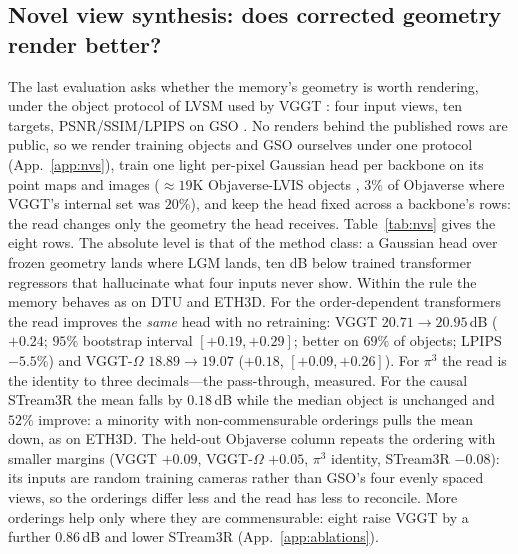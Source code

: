 \documentclass{article}
\begin{document}
\subsection{Novel view synthesis: does corrected geometry render better?}
\label{sec:nvs}
The last evaluation asks whether the memory's geometry is worth rendering,
under the object protocol of LVSM \citep{lvsm} used by VGGT \citep{vggt}:
four input views, ten targets, PSNR/SSIM/LPIPS on GSO \citep{gso}. No renders
behind the published rows are public, so we render training objects and GSO
ourselves under one protocol (App.~\ref{app:nvs}), train one light per-pixel
Gaussian head per backbone \citep{kerbl3dgs,splatt3r} on its point maps and
images (${\approx}19$K Objaverse-LVIS objects \citep{objaverse}, $3\%$ of
Objaverse where VGGT's internal set was $20\%$), and keep the head fixed across
a backbone's rows: the read changes only the geometry the head receives.
Table~\ref{tab:nvs} gives the eight rows. The
absolute level is that of the method class: a Gaussian head over frozen
geometry lands where LGM lands, ten dB below trained transformer regressors
that hallucinate what four inputs never show. Within the rule the memory
behaves as on DTU and ETH3D. For the order-dependent
transformers the read improves the \emph{same} head with no retraining: VGGT
$20.71\!\to\!20.95$\,dB (${+}0.24$; $95\%$ bootstrap interval
$[{+}0.19,{+}0.29]$; better on $69\%$ of objects; LPIPS $-5.5\%$) and
VGGT-$\Omega$ $18.89\!\to\!19.07$ (${+}0.18$, $[{+}0.09,{+}0.26]$). For
$\pi^3$ the read is the identity to three decimals---the pass-through, measured. For the causal STream3R the mean falls by $0.18$\,dB while
the median object is unchanged and $52\%$ improve: a minority with
non-commensurable orderings pulls the mean down, as on ETH3D. The held-out Objaverse column repeats the ordering with smaller
margins (VGGT ${+}0.09$, VGGT-$\Omega$ ${+}0.05$, $\pi^3$ identity,
STream3R $-0.08$): its inputs are random training cameras rather than GSO's
four evenly spaced views, so the orderings differ less and the read has less
to reconcile. More orderings help only where they are commensurable: eight
raise VGGT by a further $0.86$\,dB and lower STream3R (App.~\ref{app:ablations}).



\end{document}
